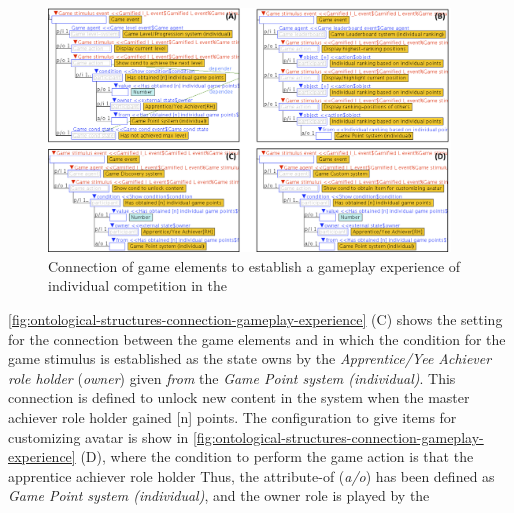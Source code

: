 \begin{figure}[!htbp]
 \caption[Connection of game elements to establish a gameplay experience of individual competition in the \emph{Gamified Cognitive Apprenticeship Scenario for Master/Yee Achiever and Apprentice/Yee Achiever}]{Connection of game elements to establish a gameplay experience of individual competition in the }
 \label{fig:ontological-structures-connection-gameplay-experience}
 \centering
 \includegraphics[width=0.95\textwidth]{images/chap-ontogacles2/ontological-structures-connection-gameplay-experience.png}
 \fautor
\end{figure}

\autoref{fig:ontological-structures-connection-gameplay-experience} (C) shows the setting for the connection between the game elements  and  in which the condition  for the game stimulus  is established as the state owns by the \emph{Apprentice/Yee Achiever role holder} (\emph{owner}) given \emph{from} the \emph{Game Point system (individual)}.
This connection is defined to unlock new content in the system when the master achiever role holder gained [n] points.
The configuration to give items for customizing avatar is show in \autoref{fig:ontological-structures-connection-gameplay-experience} (D), where the condition to perform the game action  is that the apprentice achiever role holder  Thus, the attribute-of (\emph{a/o})  has been defined as \emph{Game Point system (individual)}, and the owner role is played by the 

